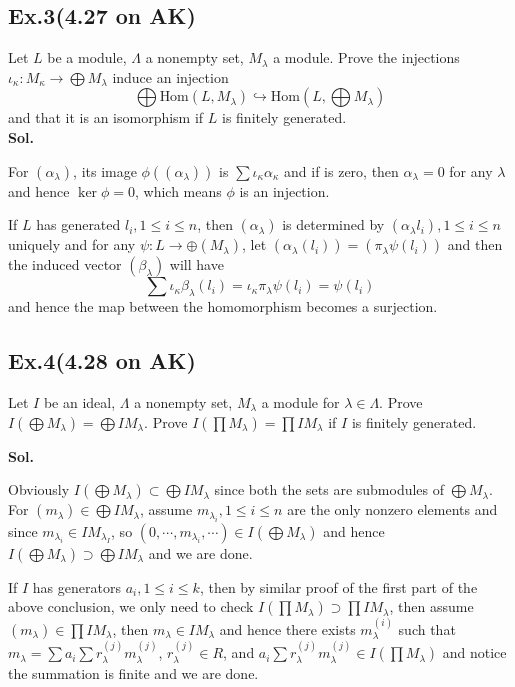\documentclass[lang=en,11pt,a4paper,citestyle =authoryear]{elegantpaper}
\begin{document}
\subsection*{Ex.3(4.27 on AK)} 
Let $L$ be a module, $\Lambda$ a nonempty set, $M_{\lambda}$ a module. Prove the injections $\iota_{\kappa}:M_{\kappa} \to \bigoplus M_{\lambda}$ induce an injection
\[
\bigoplus \text{Hom}(L,M_{\lambda}) \hookrightarrow \text{Hom}(L,\bigoplus{M_{\lambda}})
\]
and that it is an isomorphism if $L$ is finitely generated.
\vspace{0.5em}\\
\textbf{Sol.} \par
For $(\alpha_{\lambda})$, its image $\phi((\alpha_{\lambda}))$ is $\sum \iota_{\kappa}\alpha_{\kappa}$ and if is zero, then $\alpha_{\lambda} = 0$ for any $\lambda$ and hence $\ker\phi = 0$, which means $\phi$ is an injection.\par
If $L$ has generated $l_i, 1\leq i \leq n$, then $(\alpha_{\lambda})$ is determined by $(\alpha_{\lambda}l_i), 1\leq i \leq n$ uniquely and for any $\psi:L\to\oplus(M_{\lambda})$, let $(\alpha_{\lambda}(l_i)) = (\pi_{\lambda}\psi(l_i))$ and then the induced vector $(\beta_{\lambda})$ will have
\[
\sum\iota_{\kappa}\beta_{\lambda}(l_i) = \iota_{\kappa}\pi_{\lambda}\psi(l_i) = \psi(l_i)
\]
and hence the map between the homomorphism becomes a surjection.
\par 
\vspace{0.5em}

\subsection*{Ex.4(4.28 on AK)} 
Let $I$ be an ideal, $\Lambda$ a nonempty set, $M_{\lambda}$ a module for $\lambda \in \Lambda$. Prove $I(\bigoplus M_{\lambda}) = \bigoplus IM_{\lambda}$. Prove $I(\prod M_{\lambda}) = \prod I M_{\lambda}$ if $I$ is finitely generated.\par
\vspace{0.5em}
\textbf{Sol.} \par
Obviously $I(\bigoplus M_{\lambda}) \subset \bigoplus IM_{\lambda}$ since both the sets are submodules of $\bigoplus M_{\lambda}$. For $(m_{\lambda}) \in \bigoplus IM_{\lambda}$, assume $m_{\lambda_i}, 1\leq i \leq n$ are the only nonzero elements and since $m_{\lambda_i} \in IM_{\lambda_I}$, so $(0,\cdots,m_{\lambda_i},\cdots) \in I(\bigoplus M_{\lambda})$ and hence $I(\bigoplus M_{\lambda}) \supset \bigoplus IM_{\lambda}$ and we are done.\par
If $I$ has generators $a_i, 1\leq i\leq k$, then by similar proof of the first part of the above conclusion, we only need to check $I(\prod M_{\lambda}) \supset \prod I M_{\lambda}$, then assume $(m_{\lambda}) \in \prod I M_{\lambda}$, then $m_{\lambda} \in IM_{\lambda}$ and hence there exists $m_{\lambda}^{(i)}$ such that $m_{\lambda} = \sum a_i\sum r_{\lambda}^{(j)}m_{\lambda}^{(j)}$, $r_{\lambda}^{(j)} \in R$, and $a_i\sum r_{\lambda}^{(j)}m_{\lambda}^{(j)} \in I(\prod M_{\lambda})$ and notice the summation is finite and we are done. 
\par 
\vspace{0.5em}
\end{document}
